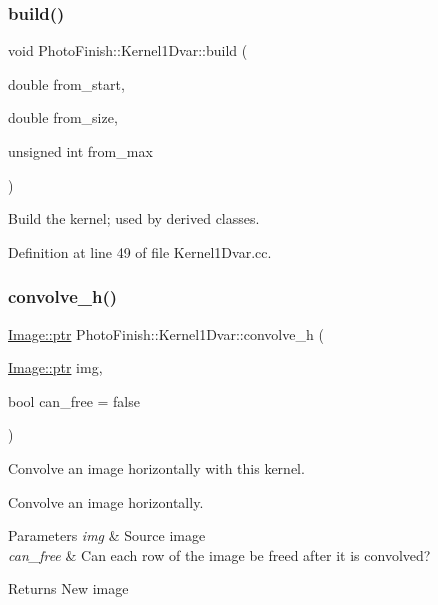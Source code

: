 \subsubsection{\texorpdfstring{build()}{build()}}
{\footnotesize\ttfamily void Photo\+Finish\+::\+Kernel1\+Dvar\+::build (\begin{DoxyParamCaption}\item[{double}]{from\+\_\+start,  }\item[{double}]{from\+\_\+size,  }\item[{unsigned int}]{from\+\_\+max }\end{DoxyParamCaption})\hspace{0.3cm}{\ttfamily [protected]}}



Build the kernel; used by derived classes. 



Definition at line 49 of file Kernel1\+Dvar.\+cc.

\mbox{\label{class_photo_finish_1_1_kernel1_dvar_a054d97ccc9d64ca9f334a376fc2473f8}} 
\subsubsection{\texorpdfstring{convolve\+\_\+h()}{convolve\_h()}}
{\footnotesize\ttfamily \hyperlink{class_photo_finish_1_1_image_ab336203305ed3a1397d7245063353b5a}{Image\+::ptr} Photo\+Finish\+::\+Kernel1\+Dvar\+::convolve\+\_\+h (\begin{DoxyParamCaption}\item[{\hyperlink{class_photo_finish_1_1_image_ab336203305ed3a1397d7245063353b5a}{Image\+::ptr}}]{img,  }\item[{bool}]{can\+\_\+free = {\ttfamily false} }\end{DoxyParamCaption})}



Convolve an image horizontally with this kernel. 

Convolve an image horizontally.


\begin{DoxyParams}{Parameters}
{\em img} & Source image \\
\hline
{\em can\+\_\+free} & Can each row of the image be freed after it is convolved? \\
\hline
\end{DoxyParams}
\begin{DoxyReturn}{Returns}
New image 
\end{DoxyReturn}


